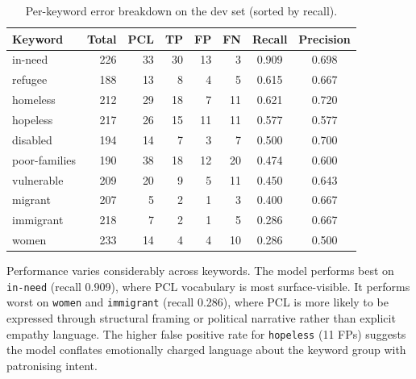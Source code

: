 \documentclass[11pt,a4paper]{article}
\begin{document}
\begin{table}[H]
    \centering
    \begin{tabular}{lrrrrrcc}
        \toprule
        \textbf{Keyword} & \textbf{Total} & \textbf{PCL} & \textbf{TP} & \textbf{FP} & \textbf{FN} & \textbf{Recall} & \textbf{Precision} \\
        \midrule
        in-need          & 226            & 33           & 30          & 13          & 3           & 0.909           & 0.698              \\
        refugee          & 188            & 13           & 8           & 4           & 5           & 0.615           & 0.667              \\
        homeless         & 212            & 29           & 18          & 7           & 11          & 0.621           & 0.720              \\
        hopeless         & 217            & 26           & 15          & 11          & 11          & 0.577           & 0.577              \\
        disabled         & 194            & 14           & 7           & 3           & 7           & 0.500           & 0.700              \\
        poor-families    & 190            & 38           & 18          & 12          & 20          & 0.474           & 0.600              \\
        vulnerable       & 209            & 20           & 9           & 5           & 11          & 0.450           & 0.643              \\
        migrant          & 207            & 5            & 2           & 1           & 3           & 0.400           & 0.667              \\
        immigrant        & 218            & 7            & 2           & 1           & 5           & 0.286           & 0.667              \\
        women            & 233            & 14           & 4           & 4           & 10          & 0.286           & 0.500              \\
        \bottomrule
    \end{tabular}
    \caption{Per-keyword error breakdown on the dev set (sorted by recall).}
    \label{tab:kw}
\end{table}

Performance varies considerably across keywords. The model performs best on \texttt{in-need} (recall 0.909), where PCL vocabulary is most surface-visible. It performs worst on \texttt{women} and \texttt{immigrant} (recall 0.286), where PCL is more likely to be expressed through structural framing or political narrative rather than explicit empathy language. The higher false positive rate for \texttt{hopeless} (11 FPs) suggests the model conflates emotionally charged language about the keyword group with patronising intent.
\end{document}

